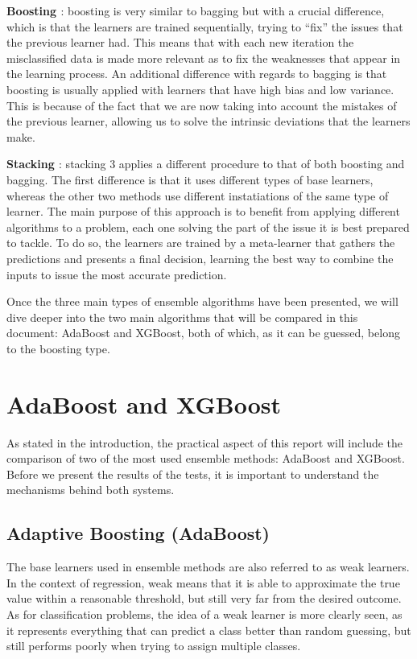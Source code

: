 \documentclass{article}
\begin{document}
\textbf{Boosting \cite{IBM}}: boosting is very similar to bagging but with a crucial difference, which is that the learners are trained sequentially, trying to “fix” the issues that the previous learner had. This means that with each new iteration the misclassified data is made more relevant as to fix the weaknesses that appear in the learning process. An additional difference with regards to bagging is that boosting is usually applied with learners that have high bias and low variance. This is because of the fact that we are now taking into account the mistakes of the previous learner, allowing us to solve the intrinsic deviations that the learners make.

\textbf{Stacking \cite{Vidhya}}: stacking 3 applies a different procedure to that of both boosting and bagging. The first difference is that it uses different types of base learners, whereas the other two methods use different instatiations of the same type of learner. The main purpose of this approach is to benefit from applying different algorithms to a problem, each one solving the part of the issue it is best prepared to tackle. To do so, the learners are trained by a meta-learner that gathers the predictions and presents a final decision, learning the best way to combine the inputs to issue the most accurate prediction.

Once the three main types of ensemble algorithms have been presented, we will dive deeper into the two main algorithms that will be compared in this document: AdaBoost and XGBoost, both of which, as it can be guessed, belong to the boosting type.


\section{AdaBoost and XGBoost}

As stated in the introduction, the practical aspect of this report will include the comparison of two of the most used ensemble methods: AdaBoost and XGBoost. Before we present the results of the tests, it is important to understand the mechanisms behind both systems.

\subsection{Adaptive Boosting (AdaBoost)}

The base learners used in ensemble methods are also referred to as weak learners. In the context of regression, weak means that it is able to approximate the true value within a reasonable threshold, but still very far from the desired outcome. As for classification problems, the idea of a weak learner is more clearly seen, as it represents everything that can predict a class better than random guessing, but still performs poorly when trying to assign multiple classes. 
\end{document}
